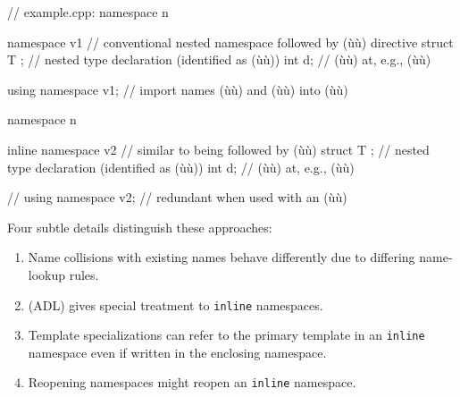 \begin{emcppslisting}
// example.cpp:
namespace n
{
    namespace v1  // conventional nested namespace followed by (ù{}ù) directive
    {
        struct T { };     // nested type declaration (identified as (ù{}ù))
        int d;            // (ù{}ù) at, e.g., (ù{}ù)
    }

    using namespace v1;   // import names (ù{}ù) and (ù{}ù) into (ù{}ù)
}

namespace n
{
    inline namespace v2   // similar to being followed by (ù{}ù)
    {
        struct T { };     // nested type declaration (identified as (ù{}ù))
        int d;            // (ù{}ù) at, e.g., (ù{}ù)
    }

    // using namespace v2;  // redundant when used with an (ù{}ù)
}
\end{emcppslisting}
    
 
\noindent Four subtle details distinguish these approaches:
\begin{enumerate}
\item{Name collisions with existing names behave differently due to differing name-lookup rules.}
\item{ (ADL) gives special treatment to \lstinline!inline! namespaces.}
\item{Template specializations can refer to the primary template in an \lstinline!inline! namespace even if written in the enclosing namespace.}
\item{Reopening namespaces might reopen an \lstinline!inline! namespace.}
\end{enumerate}

